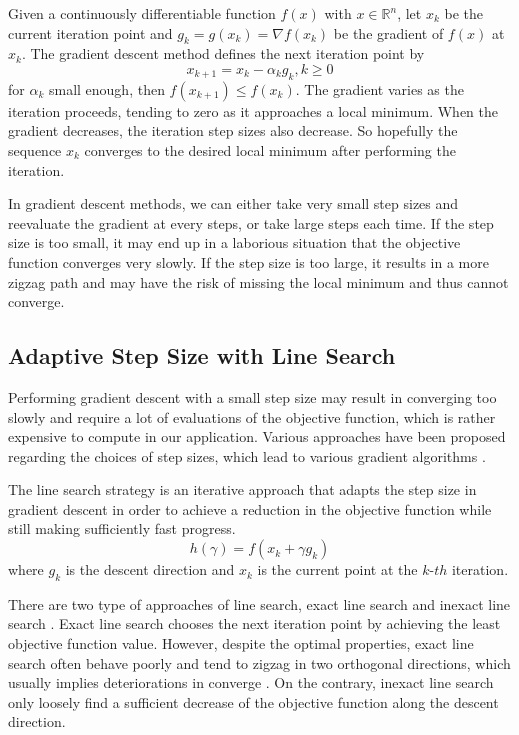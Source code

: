 Given a continuously differentiable function $ f(x) $ with $ x \in \mathbb{R}^{n} $, let $ x_{k} $ be the current iteration point and $ g_{k}=g(x_{k})= \nabla f(x_{k}) $ be the gradient of $ f(x) $ at $ x_{k} $. The gradient descent method defines the next iteration point by
\[ x_{k+1}=x_{k}- \alpha_{k} g_{k} , k \geq 0 \]
for $ \alpha_{k} $ small enough, then $ f(x_{k+1}) \leq f(x_{k}) $. The gradient varies as the iteration proceeds, tending to zero as it approaches a local minimum. When the gradient decreases, the iteration step sizes also decrease. So hopefully the sequence $ {x_{k}} $ converges to the desired local minimum after performing the iteration.

In gradient descent methods, we can either take very small step sizes and reevaluate the gradient at every steps, or take large steps each time. If the step size is too small, it may end up in a laborious situation that the objective function converges very slowly. If the step size is too large, it results in a more zigzag path and may have the risk of missing the local minimum and thus cannot converge.

\subsection{Adaptive Step Size with Line Search}
Performing gradient descent with a small step size may result in converging too slowly and require a lot of evaluations of the objective function, which is rather expensive to compute in our application. Various approaches have been proposed regarding the choices of step sizes, which lead to various gradient algorithms \cite{yuan_step-sizes_2008}.

The line search strategy is an iterative approach that adapts the step size in gradient descent in order to achieve a reduction in the objective function while still making sufficiently fast progress.
\[ h( \gamma)=f(x_{k}+\gamma g_{k}) \]
where $ g_{k} $ is the descent direction and $ x_{k} $ is the current point at the $ k$-$th $ iteration.

There are two type of approaches of line search, exact line search and inexact line search \cite{vrahatis_class_2000}.
Exact line search chooses the next iteration point by achieving the least objective function value. However, despite the optimal properties, exact line search often behave poorly and tend to zigzag in two orthogonal directions, which usually implies deteriorations in converge \cite{zhou_gradient_2006}.
On the contrary, inexact line search only loosely find a sufficient decrease of the objective function along the descent direction.

